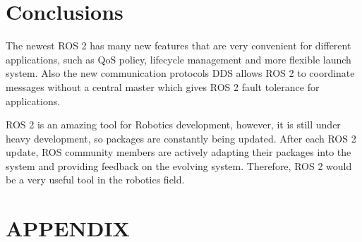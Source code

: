 \documentclass[letterpaper, 10 pt, conference]{ieeeconf}  %
\begin{document}
\section{Conclusions}\label{conclusions}
The newest ROS 2 has many new features that are very convenient for different applications, such as QoS policy, lifecycle management and more flexible launch system. Also the new communication protocols DDS allows ROS 2 to coordinate messages without a central master which gives ROS 2 fault tolerance for applications. 

ROS 2 is an amazing tool for Robotics development, however, it is still under heavy development, so packages are constantly being updated. After each ROS 2 update, ROS community members are actively adapting their packages into the system and providing feedback on the evolving system. Therefore, ROS 2 would be a very useful tool in the robotics field.  

\addtolength{\textheight}{-12cm}   %

\section*{APPENDIX}

\end{document}
